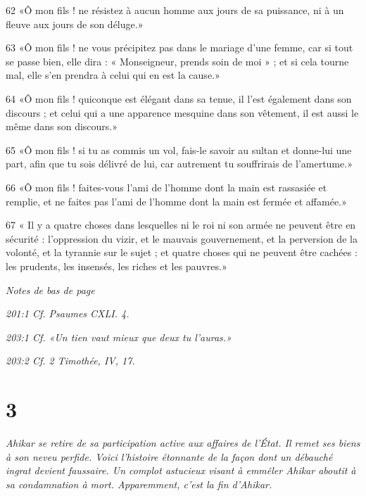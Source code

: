\par 62 «Ô mon fils ! ne résistez à aucun homme aux jours de sa puissance, ni à un fleuve aux jours de son déluge.»

\par 63 «Ô mon fils ! ne vous précipitez pas dans le mariage d'une femme, car si tout se passe bien, elle dira : « Monseigneur, prends soin de moi » ; et si cela tourne mal, elle s'en prendra à celui qui en est la cause.»

\par 64 «Ô mon fils ! quiconque est élégant dans sa tenue, il l'est également dans son discours ; et celui qui a une apparence mesquine dans son vêtement, il est aussi le même dans son discours.»

\par 65 «Ô mon fils ! si tu as commis un vol, fais-le savoir au sultan et donne-lui une part, afin que tu sois délivré de lui, car autrement tu souffrirais de l'amertume.»

\par 66 «Ô mon fils ! faites-vous l'ami de l'homme dont la main est rassasiée et remplie, et ne faites pas l'ami de l'homme dont la main est fermée et affamée.»

\par 67 « Il y a quatre choses dans lesquelles ni le roi ni son armée ne peuvent être en sécurité : l'oppression du vizir, et le mauvais gouvernement, et la perversion de la volonté, et la tyrannie sur le sujet ; et quatre choses qui ne peuvent être cachées : les prudents, les insensés, les riches et les pauvres.»

\par \textit{Notes de bas de page}

\par \textit{201:1 Cf. Psaumes CXLI. 4.}

\par \textit{203:1 Cf. «Un tien vaut mieux que deux tu l'auras.»}

\par \textit{203:2 Cf. 2 Timothée, IV, 17.}

\chapter{3}

\par \textit{Ahikar se retire de sa participation active aux affaires de l'État. Il remet ses biens à son neveu perfide. Voici l’histoire étonnante de la façon dont un débauché ingrat devient faussaire. Un complot astucieux visant à emmêler Ahikar aboutit à sa condamnation à mort. Apparemment, c'est la fin d'Ahikar.}

